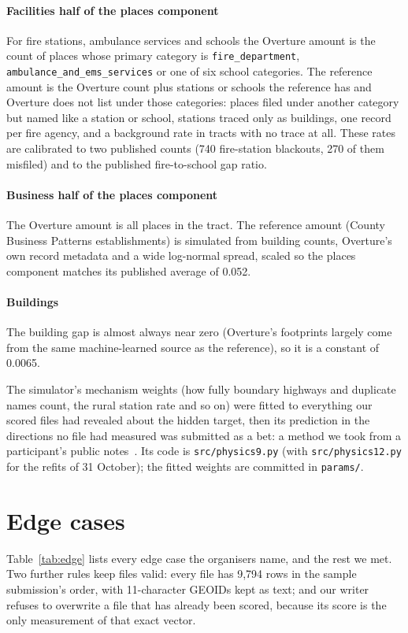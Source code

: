 \documentclass[10pt,twocolumn,a4paper]{article}
\newcommand{\code}[1]{\texttt{\small #1}}
\begin{document}
\paragraph{Facilities half of the places component} For fire stations, ambulance services and schools the Overture
amount is the count of places whose primary category is \code{fire\_department}, \code{ambulance\_and\_ems\_services} or
one of six school categories. The reference amount is the Overture count plus stations or schools the reference has and
Overture does not list under those categories: places filed under another category but named like a station or school,
stations traced only as buildings, one record per fire agency, and a background rate in tracts with no trace at all.
These rates are calibrated to two published counts (740 fire-station blackouts, 270 of them misfiled) and to the published
fire-to-school gap ratio.

\paragraph{Business half of the places component} The Overture amount is all places in the tract. The reference amount
(County Business Patterns establishments) is simulated from building counts, Overture's own record metadata and a wide
log-normal spread, scaled so the places component matches its published average of 0.052.

\paragraph{Buildings} The building gap is almost always near zero (Overture's footprints largely come from the same
machine-learned source as the reference), so it is a constant of 0.0065.

The simulator's mechanism weights (how fully boundary highways and duplicate names count, the rural station rate and so
on) were fitted to everything our scored files had revealed about the hidden target, then its prediction in the directions
no file had measured was submitted as a bet: a method we took from a participant's public notes~\cite{dante}. Its code is
\code{src/physics9.py}
(with \code{src/physics12.py} for the refits of 31 October); the fitted weights are committed in \code{params/}.

\section{Edge cases}
\label{sec:edge}
Table~\ref{tab:edge} lists every edge case the organisers name, and the rest we met. Two further rules keep files valid:
every file has 9,794 rows in the sample submission's order, with 11-character GEOIDs kept as text; and our writer refuses
to overwrite a file that has already been scored, because its score is the only measurement of that exact vector.
\end{document}
